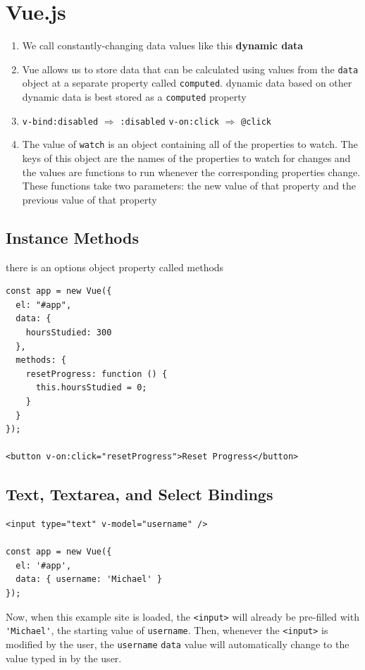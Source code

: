 \documentclass[a4paper, 12pt]{article}
\begin{document}
\section{Vue.js}
\begin{enumerate}
\item We call constantly-changing data values like this \textbf{dynamic data}

\item Vue allows us to store data that can be calculated using values from the \verb|data| object at a separate property called \verb|computed|. dynamic data based on other dynamic data is best stored as a \verb|computed| property

\item \verb|v-bind:disabled| $\Rightarrow$ \verb|:disabled| \quad \verb|v-on:click| $\Rightarrow$ \verb|@click|

\item The value of \verb|watch| is an object containing all of the properties to watch. The keys of this object are the names of the properties to watch for changes and the values are functions to run whenever the corresponding properties change. These functions take two parameters: the new value of that property and the previous value of that property



\end{enumerate}

\subsection{Instance Methods}
there is an options object property called methods
\begin{verbatim}
const app = new Vue({
  el: "#app",
  data: {
    hoursStudied: 300
  },
  methods: {
    resetProgress: function () {
      this.hoursStudied = 0;
    }
  }
});

<button v-on:click="resetProgress">Reset Progress</button>
\end{verbatim}

\subsection{Text, Textarea, and Select Bindings}
\begin{verbatim}
<input type="text" v-model="username" />

const app = new Vue({ 
  el: '#app',
  data: { username: 'Michael' } 
});
\end{verbatim}
Now, when this example site is loaded, the \verb|<input>| will already be pre-filled with \verb|'Michael'|, the starting value of \verb|username|. Then, whenever the \verb|<input>| is modified by the user, the \verb|username| \verb|data| value will automatically change to the value typed in by the user.
\end{document}
